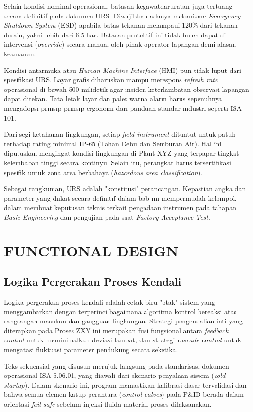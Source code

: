 \documentclass[12pt, a4paper]{report}
\begin{document}
Selain kondisi nominal operasional, batasan kegawatdaruratan juga tertuang secara definitif pada dokumen URS. Diwajibkan adanya mekanisme \textit{Emergency Shutdown System} (ESD) apabila batas tekanan melampaui 120\% dari tekanan desain, yakni lebih dari 6.5 bar. Batasan protektif ini tidak boleh dapat di-intervensi (\textit{override}) secara manual oleh pihak operator lapangan demi alasan keamanan.

Kondisi antarmuka atau \textit{Human Machine Interface} (HMI) pun tidak luput dari spesifikasi URS. Layar grafis diharuskan mampu merespons \textit{refresh rate} operasional di bawah 500 milidetik agar insiden keterlambatan observasi lapangan dapat ditekan. Tata letak layar dan palet warna alarm harus sepenuhnya mengadopsi prinsip-prinsip ergonomi dari panduan standar industri seperti ISA-101.

Dari segi ketahanan lingkungan, setiap \textit{field instrument} dituntut untuk patuh terhadap rating minimal IP-65 (Tahan Debu dan Semburan Air). Hal ini diputuskan mengingat kondisi lingkungan di Plant XYZ yang terpapar tingkat kelembaban tinggi secara kontinyu. Selain itu, perangkat harus tersertifikasi spesifik untuk zona area berbahaya (\textit{hazardous area classification}).

Sebagai rangkuman, URS adalah "konstitusi" perancangan. Kepastian angka dan parameter yang diikat secara definitif dalam bab ini mempermudah kelompok dalam membuat keputusan teknis terkait pengadaan instrumen pada tahapan \textit{Basic Engineering} dan pengujian pada saat \textit{Factory Acceptance Test}.

\chapter{FUNCTIONAL DESIGN}

\section{Logika Pergerakan Proses Kendali}
Logika pergerakan proses kendali adalah cetak biru "otak" sistem yang menggambarkan dengan terperinci bagaimana algoritma kontrol bereaksi atas rangsangan masukan dan gangguan lingkungan. Strategi pengendalian inti yang diterapkan pada Proses ZXY ini merupakan fusi fungsional antara \textit{feedback control} untuk meminimalkan deviasi lambat, dan strategi \textit{cascade control} untuk mengatasi fluktuasi parameter pendukung secara seketika.

Teks sekuensial yang disusun merujuk langsung pada standarisasi dokumen operasional ISA-5.06.01, yang diawali dari skenario penyalaan sistem (\textit{cold startup}). Dalam skenario ini, program memastikan kalibrasi dasar tervalidasi dan bahwa semua elemen katup perantara (\textit{control valves}) pada P\&ID berada dalam orientasi \textit{fail-safe} sebelum injeksi fluida material proses dilaksanakan.
\end{document}
